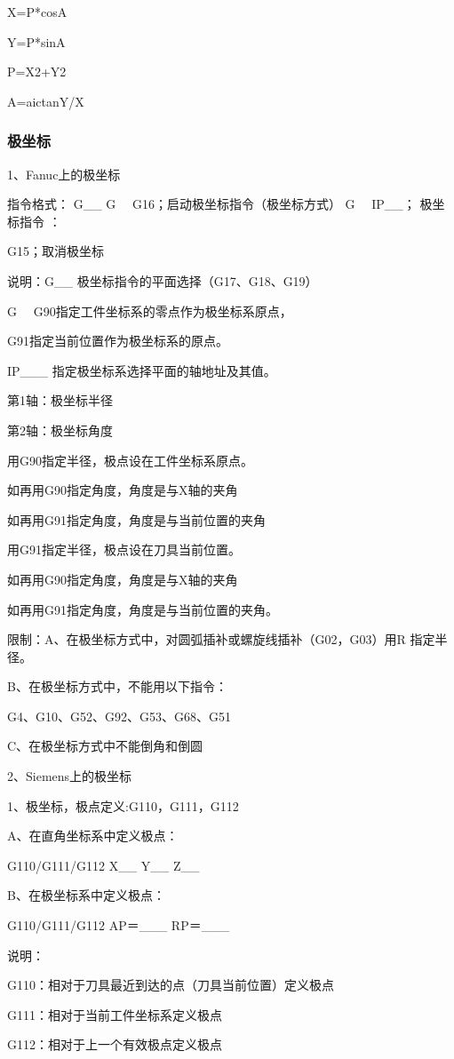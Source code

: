 X=P*cosA

Y=P*sinA

P=X2+Y2

A=aictanY/X

\subsubsection{极坐标}

1、Fanuc上的极坐标

指令格式： G\_\_ G~~ G16；启动极坐标指令（极坐标方式）
G~~ IP\_\_； 极坐标指令
：

G15；取消极坐标

说明：G\_\_ 极坐标指令的平面选择（G17、G18、G19）

G~~ G90指定工件坐标系的零点作为极坐标系原点，

G91指定当前位置作为极坐标系的原点。

IP\_\_\_ 指定极坐标系选择平面的轴地址及其值。

第1轴：极坐标半径

第2轴：极坐标角度 

用G90指定半径，极点设在工件坐标系原点。

如再用G90指定角度，角度是与X轴的夹角

如再用G91指定角度，角度是与当前位置的夹角

用G91指定半径，极点设在刀具当前位置。

如再用G90指定角度，角度是与X轴的夹角

如再用G91指定角度，角度是与当前位置的夹角。

限制：A、在极坐标方式中，对圆弧插补或螺旋线插补（G02，G03）用R 指定半径。

B、在极坐标方式中，不能用以下指令：

G4、G10、G52、G92、G53、G68、G51

C、在极坐标方式中不能倒角和倒圆

2、Siemens上的极坐标

1、极坐标，极点定义:G110，G111，G112 

A、在直角坐标系中定义极点：

G110/G111/G112 X\_\_ Y\_\_ Z\_\_ 

B、在极坐标系中定义极点：

G110/G111/G112 AP＝\_\_\_ RP＝\_\_\_

说明： 

G110：相对于刀具最近到达的点（刀具当前位置）定义极点

G111：相对于当前工件坐标系定义极点

G112：相对于上一个有效极点定义极点

